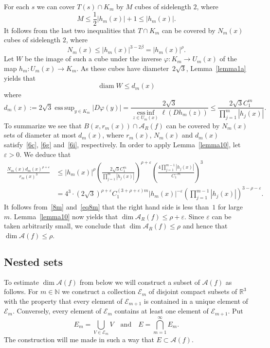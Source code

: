 \documentclass[12pt,a4paper]{amsart}
\theoremstyle{plain}
\theoremstyle{definition}
\theoremstyle{remark}
\newcommand{\diam}{\operatorname{diam}}
\DeclareMathOperator*{\esssup}{ess\,sup}
\DeclareMathOperator*{\essinf}{ess\,inf}
\def\R{\mathbb R}
\def\N{\mathbb N}
\def\cA{\mathcal A}
\def\cE{\mathcal E}
\numberwithin{equation}{section}
\begin{document}
For each $s$ we can cover $T(s)\cap K_m$  by $M$ cubes of 
sidelength $2$, where 
\begin{equation}\label{6f}
M\leq \frac12 |h_m(x)| +1 \leq |h_m(x)|.
\end{equation}
It follows from the last two inequalities that $T\cap K_m$
can be covered by $N_m(x)$ cubes  of sidelength $2$, where 
\begin{equation}\label{6g}
N_m(x)\leq |h_m(x)|^{3-2\beta} =|h_m(x)|^\rho .
\end{equation}
Let $W$ be the image of such a cube under the inverse 
$\varphi\colon K_m \to U_m(x)$ of the map $h_m\colon U_m(x)\to K_m$.
As these cubes have diameter~$2\sqrt{3}$, Lemma~\ref{lemma1a} yields that
\begin{equation}\label{6h}
\diam W\leq d_m(x) 
\end{equation}
where
\begin{equation}\label{6i}
d_m(x) 
:= 2\sqrt{3} \esssup_{y\in K_m} |D\varphi(y)|
= \frac{2\sqrt{3}}{\essinf\limits_{z\in U_m(x)}\ell(Dh_{m}(z))}
\leq  \frac{2\sqrt{3}C_1^{m}}{\prod_{j=1}^{m} |h_j(x)|}.
\end{equation}
To summarize we see that $B(x,r_m(x))\cap \cA_R(f)$ can be covered by $N_m(x)$ sets of 
diameter at most $d_m(x)$, where $r_m(x)$, $N_m(x)$ and $d_m(x)$ satisfy~\eqref{6c},
\eqref{6g} and~\eqref{6i}, respectively.
In order to apply Lemma~\ref{lemma10}, let $\varepsilon>0$.
We deduce that
\begin{equation}\label{6j}
\begin{aligned}
\frac{N_m(x)d_m(x)^{\rho +\varepsilon}}{r_m(x)^{3}}
&\leq 
|h_m(x)|^\rho 
\left(  \frac{2\sqrt{3}C_1^{m}}{\prod_{j=1}^{m} |h_j(x)|}\right)^{\rho+\varepsilon}
\left( \frac{4 \prod_{j=1}^{m-1} |h_j(x)|}{C_1^{-m}}\right)^{3}
\\  &
= 4^3\cdot  \left(2\sqrt{3}\right)^{\rho+\varepsilon} C_1^{(3+\rho+\varepsilon)m}
|h_m(x)|^{-\varepsilon} \left(\prod_{j=1}^{m-1} |h_j(x)|\right)^{\! 3-\rho-\varepsilon} .
\end{aligned}
\end{equation}
It follows from~\eqref{8m} and~\eqref{eq8m} that the right hand side is less than~$1$ for large~$m$.
Lemma~\ref{lemma10} now yields that $\dim \cA_R(f)\leq \rho+\varepsilon$. Since 
$\varepsilon$ can be taken arbitrarily small, we conclude that $\dim \cA_R(f)\leq \rho$
and hence that $\dim\cA(f)\leq\rho$.

\subsection{Nested sets} \label{nested}
To estimate $\dim \cA(f)$ from below we will construct a subset of $\cA(f)$ as follows.
For $m\in \N$ we construct a collection ${\mathcal E}_m$ of disjoint compact
subsets of $\R^3$ with the property that every element of ${\mathcal E}_{m+1}$ is
contained in a unique element of ${\mathcal E}_m$. Conversely, every element
of ${\mathcal E}_m$ contains at least one element of ${\mathcal E}_{m+1}$.  Put
\begin{equation}\label{3a}
E_m=\bigcup_{V\in\cE_m} V
\quad\text{and}\quad
E=\bigcap^\infty_{m=1} E_m. 
\end{equation}
The construction will me made in such a way that $E\subset \cA(f)$.
\end{document}
